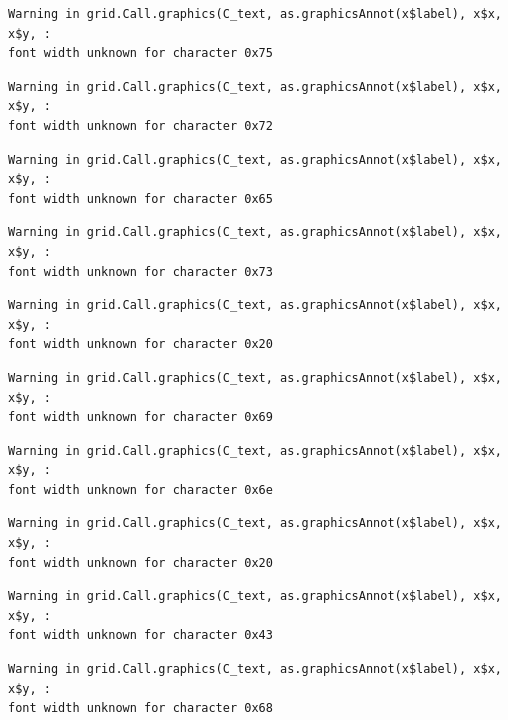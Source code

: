 \documentclass[
  letterpaper,
  DIV=11,
  numbers=noendperiod]{scrreprt}
\begin{document}
\begin{verbatim}
Warning in grid.Call.graphics(C_text, as.graphicsAnnot(x$label), x$x, x$y, :
font width unknown for character 0x75
\end{verbatim}

\begin{verbatim}
Warning in grid.Call.graphics(C_text, as.graphicsAnnot(x$label), x$x, x$y, :
font width unknown for character 0x72
\end{verbatim}

\begin{verbatim}
Warning in grid.Call.graphics(C_text, as.graphicsAnnot(x$label), x$x, x$y, :
font width unknown for character 0x65
\end{verbatim}

\begin{verbatim}
Warning in grid.Call.graphics(C_text, as.graphicsAnnot(x$label), x$x, x$y, :
font width unknown for character 0x73
\end{verbatim}

\begin{verbatim}
Warning in grid.Call.graphics(C_text, as.graphicsAnnot(x$label), x$x, x$y, :
font width unknown for character 0x20
\end{verbatim}

\begin{verbatim}
Warning in grid.Call.graphics(C_text, as.graphicsAnnot(x$label), x$x, x$y, :
font width unknown for character 0x69
\end{verbatim}

\begin{verbatim}
Warning in grid.Call.graphics(C_text, as.graphicsAnnot(x$label), x$x, x$y, :
font width unknown for character 0x6e
\end{verbatim}

\begin{verbatim}
Warning in grid.Call.graphics(C_text, as.graphicsAnnot(x$label), x$x, x$y, :
font width unknown for character 0x20
\end{verbatim}

\begin{verbatim}
Warning in grid.Call.graphics(C_text, as.graphicsAnnot(x$label), x$x, x$y, :
font width unknown for character 0x43
\end{verbatim}

\begin{verbatim}
Warning in grid.Call.graphics(C_text, as.graphicsAnnot(x$label), x$x, x$y, :
font width unknown for character 0x68
\end{verbatim}
\end{document}
